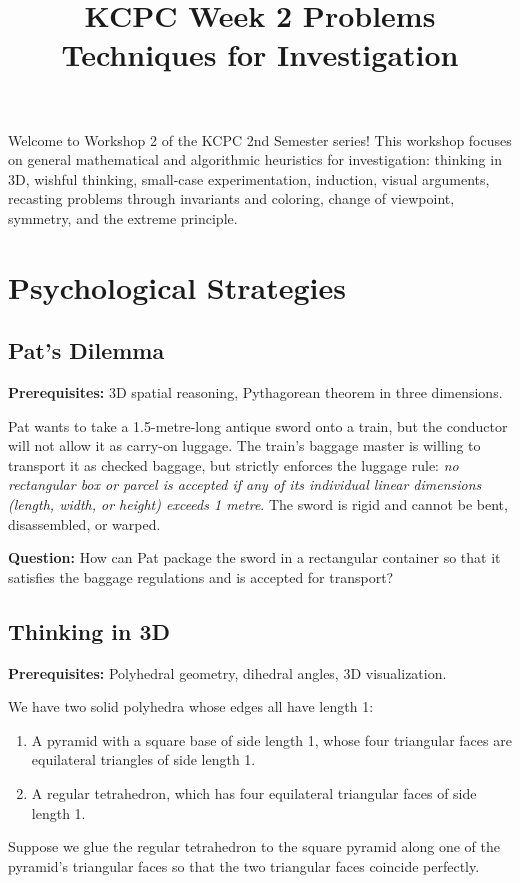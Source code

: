 \documentclass[12pt]{article}
\title{KCPC Week 2 Problems\\Techniques for Investigation}
\author{}
\date{}
\begin{document}
\maketitle
\thispagestyle{fancy}

\noindent
Welcome to Workshop 2 of the KCPC 2nd Semester series! This workshop focuses on general mathematical and algorithmic heuristics for investigation: thinking in 3D, wishful thinking, small-case experimentation, induction, visual arguments, recasting problems through invariants and coloring, change of viewpoint, symmetry, and the extreme principle.

\section{Psychological Strategies}

\subsection{Pat's Dilemma}
\textbf{Prerequisites:} 3D spatial reasoning, Pythagorean theorem in three dimensions.

Pat wants to take a 1.5-metre-long antique sword onto a train, but the conductor will not allow it as carry-on luggage. The train's baggage master is willing to transport it as checked baggage, but strictly enforces the luggage rule: \textit{no rectangular box or parcel is accepted if any of its individual linear dimensions (length, width, or height) exceeds 1 metre}. The sword is rigid and cannot be bent, disassembled, or warped.

\textbf{Question:} How can Pat package the sword in a rectangular container so that it satisfies the baggage regulations and is accepted for transport?

\subsection{Thinking in 3D}
\textbf{Prerequisites:} Polyhedral geometry, dihedral angles, 3D visualization.

We have two solid polyhedra whose edges all have length 1:
\begin{enumerate}[label=(\roman*)]
    \item A pyramid with a square base of side length 1, whose four triangular faces are equilateral triangles of side length 1.
    \item A regular tetrahedron, which has four equilateral triangular faces of side length 1.
\end{enumerate}
Suppose we glue the regular tetrahedron to the square pyramid along one of the pyramid's triangular faces so that the two triangular faces coincide perfectly.
\end{document}
